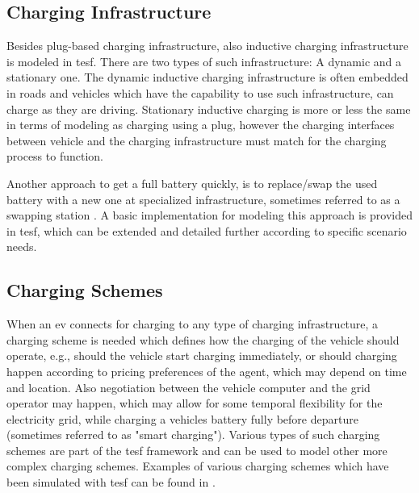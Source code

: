 \subsection{Charging Infrastructure}
Besides plug-based charging infrastructure, also inductive charging infrastructure is modeled in \gls{tesf}. There are two types of such infrastructure: A dynamic and a stationary one. The dynamic inductive charging infrastructure is often embedded in roads and vehicles which have the capability to use such infrastructure, can charge as they are driving. Stationary inductive charging is more or less the same in terms of modeling as charging using a plug, however the charging interfaces between vehicle and the charging infrastructure must match for the charging process to function.

Another approach to get a full battery quickly, is to replace/swap the used battery with a new one at specialized infrastructure, sometimes referred to as a swapping station \citep[][]{LiEtAl_ACC_2011}. A basic implementation for modeling this approach is provided in \gls{tesf}, which can be extended and detailed further according to specific scenario needs.

\subsection{Charging Schemes}
When an \gls{ev} connects for charging to any type of charging infrastructure, a charging scheme is needed which defines how the charging of the vehicle should operate, e.g., should the vehicle start charging immediately, or should charging happen according to pricing preferences of the agent, which may depend on time and location. Also negotiation between the vehicle computer and the grid operator may happen, which may allow for some temporal flexibility for the electricity grid, while charging a vehicles battery fully before departure (sometimes referred to as "smart charging"). Various types of such charging schemes are part of the \gls{tesf} framework and can be used to model other more complex charging schemes. Examples of various charging schemes which have been simulated with \gls{tesf} can be found in \citet[][]{WaraichEtAl_TRR_2013}.

